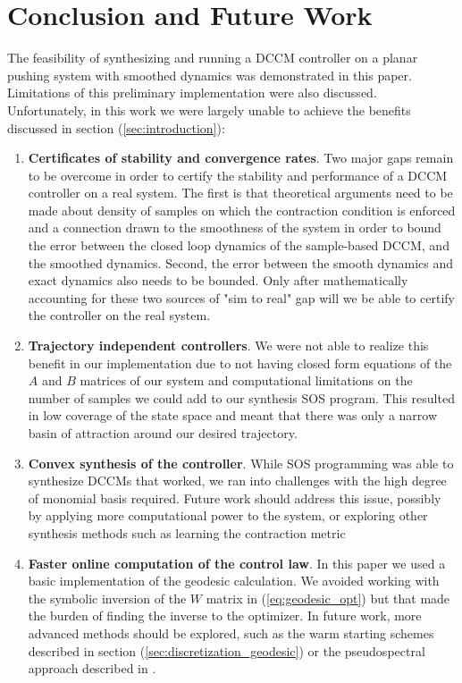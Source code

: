\documentclass[journal]{IEEEtran}
\begin{document}
\section{Conclusion and Future Work}
The feasibility of synthesizing and running a DCCM controller on a planar pushing system with smoothed dynamics was demonstrated in this paper. Limitations of this preliminary implementation were also discussed. Unfortunately, in this work we were largely unable to achieve the benefits discussed in section (\ref{sec:introduction}):
\begin{enumerate}
	\item {\bf Certificates of stability and convergence rates}. Two major gaps remain to be overcome in order to certify the stability and performance of a DCCM controller on a real system. The first is that theoretical arguments need to be made about density of samples on which the contraction condition is enforced and a connection drawn to the smoothness of the system in order to bound the error between the closed loop dynamics of the sample-based DCCM, and the smoothed dynamics. Second, the error between the smooth dynamics and exact dynamics also needs to be bounded. Only after mathematically accounting for these two sources of "sim to real" gap will we be able to certify the controller on the real system.
	\item {\bf Trajectory independent controllers}. We were not able to realize this benefit in our implementation due to not having closed form equations of the $A$ and $B$ matrices of our system and computational limitations on the number of samples we could add to our synthesis SOS program. This resulted in low coverage of the state space and meant that there was only a narrow basin of attraction around our desired trajectory.
	\item {\bf Convex synthesis of the controller}. While SOS programming was able to synthesize DCCMs that worked, we ran into challenges with the high degree of monomial basis required. Future work should address this issue, possibly by applying more computational power to the system, or exploring other synthesis methods such as learning the contraction metric \autocite{singhLearningStabilizableDynamical2018,chouModelErrorPropagation2021}
	\item {\bf Faster online computation of the control law}. In this paper we used a basic implementation of the geodesic calculation. We avoided working with the symbolic inversion of the $W$ matrix in (\ref{eq:geodesic_opt}) but that made the burden of finding the inverse to the optimizer. In future work, more advanced methods should be explored, such as the warm starting schemes described in section (\ref{sec:discretization_geodesic}) or the pseudospectral approach described in \autocite{leungNonlinearStabilizationControl2017}.
\end{enumerate}
\end{document}
